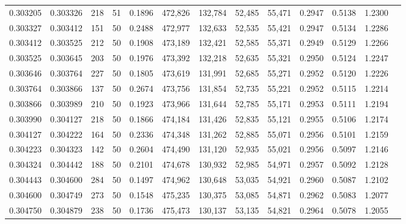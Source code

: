 \begin{tabular}{rrrrrrrrrrrrr}
0.303205 & 0.303326 &   218 &  51 &                                     0.1896 & 472,826 & 132,784 &  52,485 &  55,471 & 0.2947 & 0.5138 & 1.2300 \\
0.303327 & 0.303412 &   151 &  50 &                                     0.2488 & 472,977 & 132,633 &  52,535 &  55,421 & 0.2947 & 0.5134 & 1.2286 \\
0.303412 & 0.303525 &   212 &  50 &                                     0.1908 & 473,189 & 132,421 &  52,585 &  55,371 & 0.2949 & 0.5129 & 1.2266 \\
0.303525 & 0.303645 &   203 &  50 &                                     0.1976 & 473,392 & 132,218 &  52,635 &  55,321 & 0.2950 & 0.5124 & 1.2247 \\
0.303646 & 0.303764 &   227 &  50 &                                     0.1805 & 473,619 & 131,991 &  52,685 &  55,271 & 0.2952 & 0.5120 & 1.2226 \\
0.303764 & 0.303866 &   137 &  50 &                                     0.2674 & 473,756 & 131,854 &  52,735 &  55,221 & 0.2952 & 0.5115 & 1.2214 \\
0.303866 & 0.303989 &   210 &  50 &                                     0.1923 & 473,966 & 131,644 &  52,785 &  55,171 & 0.2953 & 0.5111 & 1.2194 \\
0.303990 & 0.304127 &   218 &  50 &                                     0.1866 & 474,184 & 131,426 &  52,835 &  55,121 & 0.2955 & 0.5106 & 1.2174 \\
0.304127 & 0.304222 &   164 &  50 &                                     0.2336 & 474,348 & 131,262 &  52,885 &  55,071 & 0.2956 & 0.5101 & 1.2159 \\
0.304223 & 0.304323 &   142 &  50 &                                     0.2604 & 474,490 & 131,120 &  52,935 &  55,021 & 0.2956 & 0.5097 & 1.2146 \\
0.304324 & 0.304442 &   188 &  50 &                                     0.2101 & 474,678 & 130,932 &  52,985 &  54,971 & 0.2957 & 0.5092 & 1.2128 \\
0.304443 & 0.304600 &   284 &  50 &                                     0.1497 & 474,962 & 130,648 &  53,035 &  54,921 & 0.2960 & 0.5087 & 1.2102 \\
0.304600 & 0.304749 &   273 &  50 &                                     0.1548 & 475,235 & 130,375 &  53,085 &  54,871 & 0.2962 & 0.5083 & 1.2077 \\
0.304750 & 0.304879 &   238 &  50 &                                     0.1736 & 475,473 & 130,137 &  53,135 &  54,821 & 0.2964 & 0.5078 & 1.2055 \\

\end{tabular}
